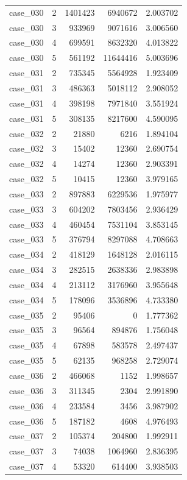 \begin{longtable}{lrrrr}
case\_030 & 2 & 1401423 & 6940672 & 2.003702 \\
case\_030 & 3 & 933969 & 9071616 & 3.006560 \\
case\_030 & 4 & 699591 & 8632320 & 4.013822 \\
case\_030 & 5 & 561192 & 11644416 & 5.003696 \\
case\_031 & 2 & 735345 & 5564928 & 1.923409 \\
case\_031 & 3 & 486363 & 5018112 & 2.908052 \\
case\_031 & 4 & 398198 & 7971840 & 3.551924 \\
case\_031 & 5 & 308135 & 8217600 & 4.590095 \\
case\_032 & 2 & 21880 & 6216 & 1.894104 \\
case\_032 & 3 & 15402 & 12360 & 2.690754 \\
case\_032 & 4 & 14274 & 12360 & 2.903391 \\
case\_032 & 5 & 10415 & 12360 & 3.979165 \\
case\_033 & 2 & 897883 & 6229536 & 1.975977 \\
case\_033 & 3 & 604202 & 7803456 & 2.936429 \\
case\_033 & 4 & 460454 & 7531104 & 3.853145 \\
case\_033 & 5 & 376794 & 8297088 & 4.708663 \\
case\_034 & 2 & 418129 & 1648128 & 2.016115 \\
case\_034 & 3 & 282515 & 2638336 & 2.983898 \\
case\_034 & 4 & 213112 & 3176960 & 3.955648 \\
case\_034 & 5 & 178096 & 3536896 & 4.733380 \\
case\_035 & 2 & 95406 & 0 & 1.777362 \\
case\_035 & 3 & 96564 & 894876 & 1.756048 \\
case\_035 & 4 & 67898 & 583578 & 2.497437 \\
case\_035 & 5 & 62135 & 968258 & 2.729074 \\
case\_036 & 2 & 466068 & 1152 & 1.998657 \\
case\_036 & 3 & 311345 & 2304 & 2.991890 \\
case\_036 & 4 & 233584 & 3456 & 3.987902 \\
case\_036 & 5 & 187182 & 4608 & 4.976493 \\
case\_037 & 2 & 105374 & 204800 & 1.992911 \\
case\_037 & 3 & 74038 & 1064960 & 2.836395 \\
case\_037 & 4 & 53320 & 614400 & 3.938503 \\

\end{longtable}
